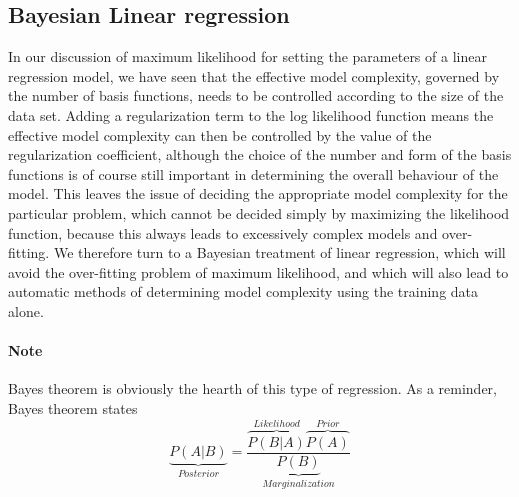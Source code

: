 \documentclass[main.tex]{subfiles}
\begin{document}
\subsection{Bayesian Linear regression} 
In our discussion of maximum likelihood for setting the parameters of a linear regression
model, we have seen that the effective model complexity, governed by the
number of basis functions, needs to be controlled according to the size of the data
set. Adding a regularization term to the log likelihood function means the effective
model complexity can then be controlled by the value of the regularization coefficient,
although the choice of the number and form of the basis functions is of course
still important in determining the overall behaviour of the model.
This leaves the issue of deciding the appropriate model complexity for the particular
problem, which cannot be decided simply by maximizing the likelihood function,
because this always leads to excessively complex models and over-fitting. We therefore turn to a Bayesian treatment of linear regression, which will
avoid the over-fitting problem of maximum likelihood, and which will also lead to
automatic methods of determining model complexity using the training data alone.

\paragraph{Note} Bayes theorem is obviously the hearth of this type of regression. As a reminder, Bayes theorem states
\begin{equation}
    \underbrace{P(A|B)}_{Posterior} = \frac{\overbrace{P(B|A)}^{Likelihood} \overbrace{P(A)}^{Prior}}{\underbrace{P(B)}_{Marginalization}}
\end{equation}
\end{document}
